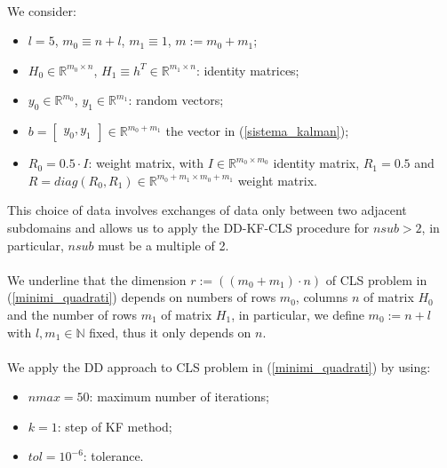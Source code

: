 \documentclass{report}
\begin{document}
\\
We consider:
\begin{itemize}
\item $l=5$, $m_0\equiv n+l$, $m_1\equiv 1$, $m:=m_0+m_1$;
\item $H_{0}\in \mathbb{R}^{m_0\times n}$, $H_{1}\equiv h^{T}\in \mathbb{R}^{m_1\times n}$:  identity matrices;
\item $y_{0} \in \mathbb{R}^{m_0}$, $y_{1}\in \mathbb{R}^{m_1}$:  random vectors; 
 \item  $b=\left[\begin{array}{ll}
y_{0}, y_{1}\end{array}\right]\in \mathbb{R}^{m_0+m_1}$ the vector in (\ref{sistema_kalman}); 
\item  ${R}_{0}=0.5\cdot I$:  weight matrix, with $I\in \mathbb{R}^{ m_0\times m_0}$ identity matrix, $R_{1}=0.5$ and $R=diag(R_{0},R_{1})\in\mathbb{R}^{m_0+m_1\times m_0+m_1}$  weight matrix.
\end{itemize}
This choice of data involves exchanges of data only between two adjacent subdomains and allows us to apply the DD-KF-CLS procedure for $nsub>2$, in particular, $nsub$ must be a multiple of 2.
\\
\\

\noindent We underline that the dimension $r:=((m_0+m_1)\cdot n)$ of CLS problem in (\ref{minimi_quadrati}) depends on numbers of rows $m_0$, columns $n$ of matrix $H_0$ and the number of rows $m_1$ of matrix $H_1$, in particular, we define $m_0:=n+l$ with $l, m_1\in \mathbb{N}$ fixed, thus it only depends on $n$. \\
\\
 We apply the DD approach to  CLS problem in (\ref{minimi_quadrati}) by using:
 \begin{itemize}
 \item  $nmax=50$:  maximum number of iterations; 
 \item $k=1$: step of KF method;
\item $tol=10^{-6}$: tolerance.
\end{itemize}
\end{document}
